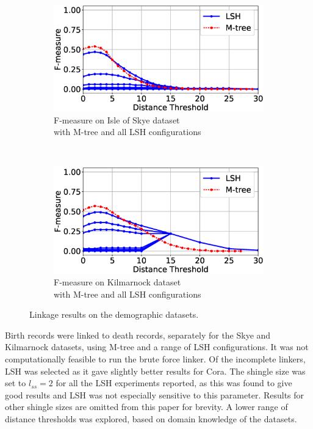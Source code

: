 \documentclass{llncs}
\begin{document}
\begin{figure}[t]
\begin{subfigure}{.47\textwidth}
  \centering
\includegraphics[width=\textwidth]{figures/plotFs-skye-f}
\caption{F-measure on Isle of Skye dataset \\ with M-tree and all
LSH configurations}
\end{subfigure}%
~~
\begin{subfigure}{.47\textwidth}
  \centering
\includegraphics[width=\textwidth]{figures/plotFs-kilmarnock-f}
\caption{F-measure on Kilmarnock dataset \\ with M-tree and all LSH configurations}
\end{subfigure}
\caption{Linkage results on the demographic datasets.}
\label{demography-quality}
\end{figure}

Birth records were linked to death records, separately for the Skye and
Kilmarnock datasets, using M-tree and a range of LSH configurations. It
was not computationally feasible to run the brute force linker. Of the
incomplete linkers, LSH was selected as it gave slightly better results
for Cora. The shingle size was set to $l_{ss}=2$ for all the LSH
experiments reported, as this was found to give good results and LSH
was not especially sensitive to this parameter. Results for other
shingle sizes are omitted from this paper for brevity. A lower range
of distance thresholds was explored, based on domain knowledge of the
datasets.
\end{document}
